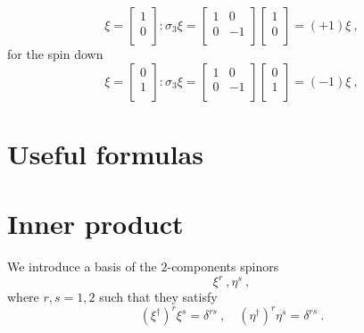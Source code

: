     \begin{equation*}
        \xi = \begin{bmatrix}
            1 \\ 0 \\
        \end{bmatrix} \colon \sigma_3 \xi = \begin{bmatrix}
            1 & 0 \\ 0 & -1 \\
        \end{bmatrix} \begin{bmatrix}
            1 \\ 0 \\
        \end{bmatrix} = (+1) \xi ~,
    \end{equation*}
    for the spin down
    \begin{equation*}
        \xi = \begin{bmatrix}
            0 \\ 1 \\
        \end{bmatrix} \colon \sigma_3 \xi = \begin{bmatrix}
            1 & 0 \\ 0 & -1 \\
        \end{bmatrix} \begin{bmatrix}
            0 \\ 1 \\
        \end{bmatrix} = (-1) \xi ~,
    \end{equation*}

\section{Useful formulas} 

\section{Inner product}

    We introduce a basis of the $2$-components spinors 
    \begin{equation*}
        \xi^r ~, \eta^s ~,
    \end{equation*}
    where $r,s = 1,2$ such that they satisfy 
    \begin{equation*}
        (\xi^\dagger)^r \xi^s = \delta^{rs} ~, \quad (\eta^\dagger)^r \eta^s = \delta^{rs}  ~.
    \end{equation*}

